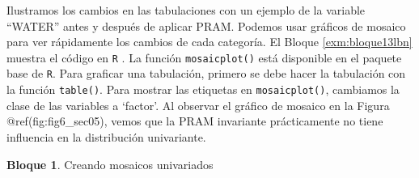 \documentclass[]{book}
\theoremstyle{definition}
\theoremstyle{definition}
\newtheorem{example}{Bloque}[chapter]
\theoremstyle{definition}
\theoremstyle{definition}
\theoremstyle{remark}
\begin{document}
Ilustramos los cambios en las tabulaciones con un ejemplo de la variable ``WATER'' antes y después de aplicar PRAM. Podemos usar gráficos de mosaico para ver rápidamente los cambios de cada categoría. El Bloque \ref{exm:bloque13lbn} muestra el código en \texttt{R} . La función \texttt{mosaicplot()} está disponible en el paquete base de \texttt{R}. Para graficar una tabulación, primero se debe hacer la tabulación con la función \texttt{table()}. Para mostrar las etiquetas en \texttt{mosaicplot()}, cambiamos la clase de las variables a `factor'. Al observar el gráfico de mosaico en la Figura @ref(fig:fig6\_sec05), vemos que la PRAM invariante prácticamente no tiene influencia en la distribución univariante.

\begin{example}
\protect\hypertarget{exm:bloque13lbn}{}{\label{exm:bloque13lbn} }Creando mosaicos univariados
\end{example}
\end{document}
